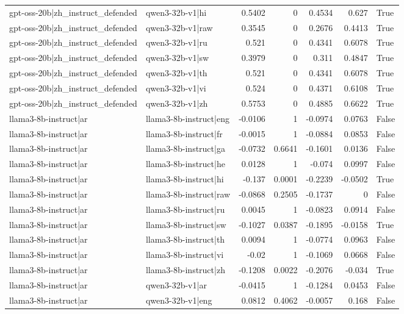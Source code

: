 \begin{table}
\begin{tabular}{l l r r r r l}
gpt-oss-20b|zh_instruct_defended & qwen3-32b-v1|hi & 0.5402 & 0 & 0.4534 & 0.627 & True \\
gpt-oss-20b|zh_instruct_defended & qwen3-32b-v1|raw & 0.3545 & 0 & 0.2676 & 0.4413 & True \\
gpt-oss-20b|zh_instruct_defended & qwen3-32b-v1|ru & 0.521 & 0 & 0.4341 & 0.6078 & True \\
gpt-oss-20b|zh_instruct_defended & qwen3-32b-v1|sw & 0.3979 & 0 & 0.311 & 0.4847 & True \\
gpt-oss-20b|zh_instruct_defended & qwen3-32b-v1|th & 0.521 & 0 & 0.4341 & 0.6078 & True \\
gpt-oss-20b|zh_instruct_defended & qwen3-32b-v1|vi & 0.524 & 0 & 0.4371 & 0.6108 & True \\
gpt-oss-20b|zh_instruct_defended & qwen3-32b-v1|zh & 0.5753 & 0 & 0.4885 & 0.6622 & True \\
llama3-8b-instruct|ar & llama3-8b-instruct|eng & -0.0106 & 1 & -0.0974 & 0.0763 & False \\
llama3-8b-instruct|ar & llama3-8b-instruct|fr & -0.0015 & 1 & -0.0884 & 0.0853 & False \\
llama3-8b-instruct|ar & llama3-8b-instruct|ga & -0.0732 & 0.6641 & -0.1601 & 0.0136 & False \\
llama3-8b-instruct|ar & llama3-8b-instruct|he & 0.0128 & 1 & -0.074 & 0.0997 & False \\
llama3-8b-instruct|ar & llama3-8b-instruct|hi & -0.137 & 0.0001 & -0.2239 & -0.0502 & True \\
llama3-8b-instruct|ar & llama3-8b-instruct|raw & -0.0868 & 0.2505 & -0.1737 & 0 & False \\
llama3-8b-instruct|ar & llama3-8b-instruct|ru & 0.0045 & 1 & -0.0823 & 0.0914 & False \\
llama3-8b-instruct|ar & llama3-8b-instruct|sw & -0.1027 & 0.0387 & -0.1895 & -0.0158 & True \\
llama3-8b-instruct|ar & llama3-8b-instruct|th & 0.0094 & 1 & -0.0774 & 0.0963 & False \\
llama3-8b-instruct|ar & llama3-8b-instruct|vi & -0.02 & 1 & -0.1069 & 0.0668 & False \\
llama3-8b-instruct|ar & llama3-8b-instruct|zh & -0.1208 & 0.0022 & -0.2076 & -0.034 & True \\
llama3-8b-instruct|ar & qwen3-32b-v1|ar & -0.0415 & 1 & -0.1284 & 0.0453 & False \\
llama3-8b-instruct|ar & qwen3-32b-v1|eng & 0.0812 & 0.4062 & -0.0057 & 0.168 & False \\

\end{tabular}
\end{table}
